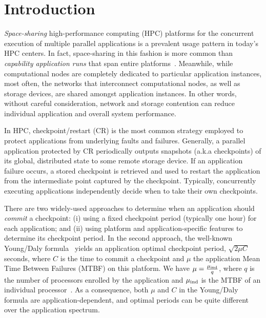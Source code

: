 
\section{Introduction}
\label{sec:intro}

\emph{Space-sharing} high-performance computing (HPC) platforms for the concurrent
execution of multiple parallel applications is a prevalent usage pattern in today's
HPC centers.
In fact, space-sharing in this fashion is more common than \emph{capability
  application runs} that span entire platforms~\cite{Weidner2016}. Meanwhile, while
computational nodes are completely dedicated to particular application instances,
most often, the networks that interconnect computational nodes, as well as storage
devices, are shared amongst application instances. In other words, without careful
consideration, network and storage contention can reduce individual application and
overall system performance.

In HPC, checkpoint/restart (CR) is the most common strategy employed to protect
applications from underlying faults and failures. Generally, a parallel application
protected by CR periodically outputs snapshots (a.k.a checkpoints) of its global,
distributed state to some remote storage device. If an application failure occurs, a
stored checkpoint is retrieved and used to restart the application from the
intermediate point captured by the checkpoint. Typically, concurrently executing
applications independently decide when to take their own
checkpoints.

There are two widely-used approaches to determine when an
application should \emph{commit} a checkpoint: (i) using a fixed checkpoint period
(typically one hour) for each application; and (ii) using platform and
application-specific features to determine its checkpoint period. In the second approach, the well-known
Young/Daly formula~\cite{young74,daly04} yields an application optimal checkpoint
period, $\sqrt{2 \mu C}$ seconds, where $C$ is the time to commit a checkpoint and
$\mu$ the application Mean Time Between Failures (MTBF) on this platform. We have $\mu = \frac{\mu_{\text{ind}}}{q}$,
where $q$ is the number of processors enrolled by the application and $\mu_{\text{ind}}$ is the
MTBF of an individual processor~\cite{springer-monograph}. As a consequence, both
$\mu$ and $C$ in the Young/Daly formula are application-dependent, and optimal
periods can be quite different over the application spectrum.

